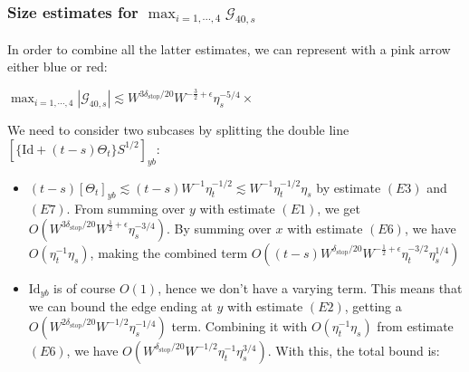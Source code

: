\documentclass[11pt]{article}
\newcommand{\sto}{\text{stop}}
\begin{document}
\newpage
\subsubsection*{Size estimates for $\max_{i=1, \cdots, 4}\mathcal{G}_{40, s}$}

In order to combine all the latter estimates, we can represent with a pink arrow either blue or red:\begin{center}

$\max_{i=1, \cdots, 4}\left\vert\mathcal{G}_{40, s}\right\vert\lesssim  W^{3\delta_\sto/20} W^{-\frac{3}{2}+\epsilon}\eta_s^{-5/4}\times $
\end{center}
We need to consider two subcases by splitting the double line $\left[\{\text{Id} + (t-s)\Theta_t\}S^{1/2}\right]_{yb}$:
\begin{itemize}
\item $(t-s)\left[\Theta_t\right]_{yb} \lesssim (t-s)W^{-1}\eta_t^{-1/2}\lesssim W^{-1}\eta_t^{-1/2}\eta_s$ by estimate $(E3)$ and $(E7)$. From summing over $y$ with estimate $(E1)$, we get $ O(W^{3\delta_\sto/20}W^{\frac{1}{2}+\epsilon}\eta_s^{-3/4})$. By summing over $x$ with estimate $(E6)$, we have $O(\eta_t^{-1}\eta_s)$, making the combined term $O((t-s) W^{\delta_\sto/20}W^{-\frac{1}{2}+\epsilon}\eta_t^{-3/2}\eta_s^{1/4})$
\item $\text{Id}_{yb}$ is of course $O(1)$, hence we don't have a varying term. This means that we can bound the edge ending at $y$ with estimate $(E2)$, getting a $O( W^{2\delta_\sto/20}W^{-1/2}\eta_s^{-1/4})$ term. Combining it with $O(\eta_t^{-1}\eta_s)$ from estimate $(E6)$, we have $O( W^{\delta_\sto/20}W^{-1/2}\eta_t^{-1}\eta_s^{3/4})$. With this, the total bound is: 
\end{itemize}
\end{document}
